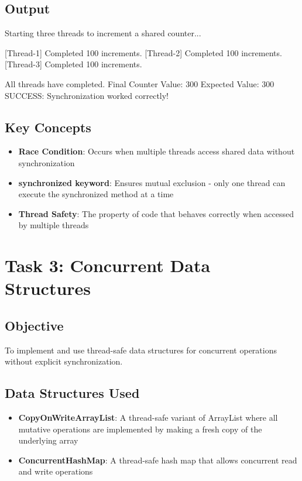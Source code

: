 \documentclass[12pt,a4paper]{article}
\let\oldverbatim\verbatim
\let\endoldverbatim\endverbatim
\renewenvironment{verbatim}
{
    \vspace{0.5em}
    \begin{framed}
    \noindent\oldverbatim
}
{
    \endoldverbatim
    \end{framed}
    \vspace{0.5em}
}
\begin{document}
\subsection{Output}
\begin{verbatim}
Starting three threads to increment a shared counter...

[Thread-1] Completed 100 increments.
[Thread-2] Completed 100 increments.
[Thread-3] Completed 100 increments.

All threads have completed.
Final Counter Value: 300
Expected Value: 300
SUCCESS: Synchronization worked correctly!
\end{verbatim}

\subsection{Key Concepts}
\begin{itemize}
    \item \textbf{Race Condition}: Occurs when multiple threads access shared data without synchronization
    \item \textbf{synchronized keyword}: Ensures mutual exclusion - only one thread can execute the synchronized method at a time
    \item \textbf{Thread Safety}: The property of code that behaves correctly when accessed by multiple threads
\end{itemize}

\newpage
\section{Task 3: Concurrent Data Structures}

\subsection{Objective}
To implement and use thread-safe data structures for concurrent operations without explicit synchronization.

\subsection{Data Structures Used}
\begin{itemize}
    \item \textbf{CopyOnWriteArrayList}: A thread-safe variant of ArrayList where all mutative operations are implemented by making a fresh copy of the underlying array
    \item \textbf{ConcurrentHashMap}: A thread-safe hash map that allows concurrent read and write operations
\end{itemize}
\end{document}
